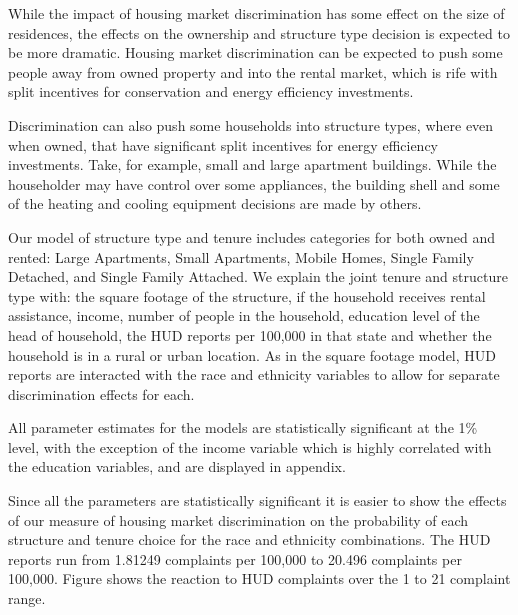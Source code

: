 \documentclass{article}
\begin{document}



While the impact of housing market discrimination has some effect on the size of residences, the effects on the ownership and structure type decision is expected to be more dramatic.  Housing market discrimination can be expected to push some people away from owned property and into the rental market, which is rife with split incentives for conservation and energy efficiency investments.  

Discrimination can also push some households into structure types, where even when owned, that have significant split incentives for energy efficiency investments.  Take, for example, small and large apartment buildings.  While the householder may have control over some appliances, the building shell and some of the heating and cooling equipment decisions are made by others.  

Our model of structure type and tenure includes categories for both owned and rented: Large Apartments, Small Apartments, Mobile Homes, Single Family Detached, and Single Family Attached.  We explain the joint tenure and structure type with: the square footage of the structure, if the household receives rental assistance, income, number of people in the household, education level of the head of household, the HUD reports per 100,000 in that state and whether the household is in a rural or urban location.  As in the square footage model, HUD reports are interacted with the race and ethnicity variables to allow for separate discrimination effects for each.


All parameter estimates for the models are statistically significant at the 1\% level, with the exception of the income variable which is highly correlated with the education variables, and are displayed in appendix. 


Since all the parameters are statistically significant it is easier to show the effects of our measure of housing market discrimination on the probability of each structure and tenure choice for the race and ethnicity combinations.  The HUD reports run from 1.81249 complaints per 100,000 to 20.496 complaints per 100,000.  Figure 
shows the reaction to HUD complaints over the 1 to 21 complaint range.
\end{document}
